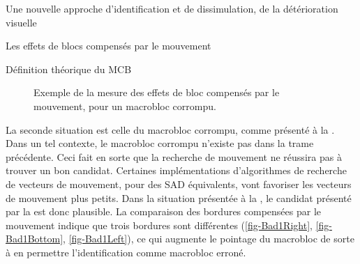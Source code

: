 \begin{chapter}{Une nouvelle approche d'identification et de dissimulation, de
la détérioration visuelle}
\begin{section}{Les effets de blocs compensés par le mouvement}
\begin{subsection}{Définition théorique du MCB}
\begin{figure}
{{			
		}
	}
	\caption[Exemple du MCB pour un macrobloc corrompu]{Exemple de la mesure des
effets de bloc compensés par le mouvement, pour un macrobloc corrompu.}
	\label{fig-Bad1}
\end{figure}

La seconde situation est celle du macrobloc corrompu, comme présenté à la
. Dans un tel contexte, le macrobloc corrompu n'existe pas dans la
trame précédente. Ceci fait en sorte que la recherche de mouvement ne réussira
pas à trouver un bon candidat. Certaines implémentations d'algorithmes de
recherche de vecteurs de mouvement, pour des SAD équivalents, vont favoriser les
vecteurs de mouvement plus petits. Dans la situation présentée à la
, le candidat présenté par la 
est donc plausible. La comparaison des bordures compensées par le mouvement
indique que trois bordures sont différentes (\ref{fig-Bad1Right},
\ref{fig-Bad1Bottom}, \ref{fig-Bad1Left}), ce qui augmente le pointage du
macrobloc de sorte à en permettre l'identification comme macrobloc erroné.


\end{subsection}
\end{section}
\end{chapter}
